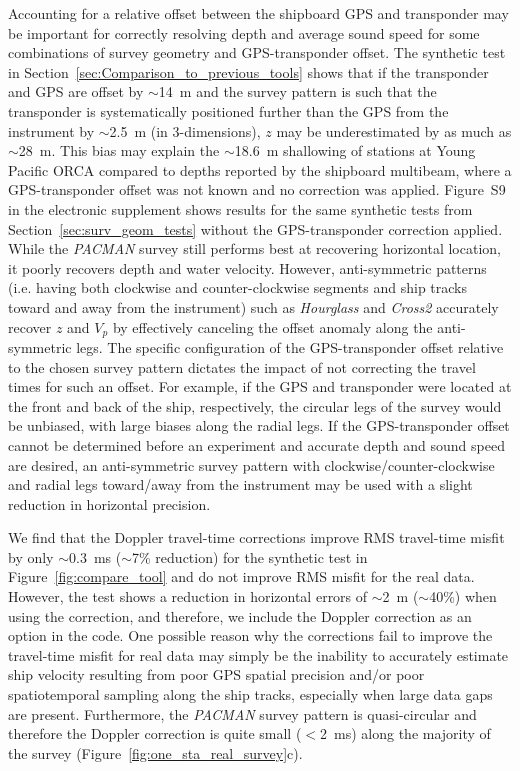 Accounting for a relative offset between the shipboard GPS and transponder may be important for correctly resolving depth and average sound speed for some combinations of survey geometry and GPS-transponder offset. The synthetic test in Section~\ref{sec:Comparison_to_previous_tools} shows that if the transponder and GPS are offset by $\sim$14~m and the survey pattern is such that the transponder is systematically positioned further than the GPS from the instrument by $\sim$2.5~m (in 3-dimensions), $z$ may be underestimated by as much as $\sim$28~m. This bias may explain the $\sim$18.6~m shallowing of stations at Young Pacific ORCA compared to depths reported by the shipboard multibeam, where a GPS-transponder offset was not known and no correction was applied. Figure~S9 in the electronic supplement shows results for the same synthetic tests from Section~\ref{sec:surv_geom_tests} without the GPS-transponder correction applied. While the \textit{PACMAN} survey still performs best at recovering horizontal location, it poorly recovers depth and water velocity. However, anti-symmetric patterns (i.e. having both clockwise and counter-clockwise segments and ship tracks toward and away from the instrument) such as \textit{Hourglass} and \textit{Cross2} accurately recover $z$ and $V_p$ by effectively canceling the offset anomaly along the anti-symmetric legs. The specific configuration of the GPS-transponder offset relative to the chosen survey pattern dictates the impact of not correcting the travel times for such an offset. For example, if the GPS and transponder were located at the front and back of the ship, respectively, the circular legs of the survey would be unbiased, with large biases along the radial legs. If the GPS-transponder offset cannot be determined before an experiment and accurate depth and sound speed are desired, an anti-symmetric survey pattern with clockwise/counter-clockwise and radial legs toward/away from the instrument may be used with a slight reduction in horizontal precision.

We find that the Doppler travel-time corrections improve RMS travel-time misfit by only $\sim$0.3~ms ($\sim$7\% reduction) for the synthetic test in Figure~\ref{fig:compare_tool} and do not improve RMS misfit for the real data. However, the test shows a reduction in horizontal errors of $\sim$2~m ($\sim$40\%) when using the correction, and therefore, we include the Doppler correction as an option in the code. One possible reason why the corrections fail to improve the travel-time misfit for real data may simply be the inability to accurately estimate ship velocity resulting from poor GPS spatial precision and/or poor spatiotemporal sampling along the ship tracks, especially when large data gaps are present. Furthermore, the \textit{PACMAN} survey pattern is quasi-circular and therefore the Doppler correction is quite small ($<$2~ms) along the majority of the survey (Figure~\ref{fig:one_sta_real_survey}c).

